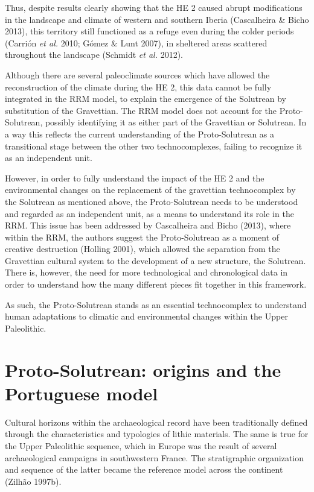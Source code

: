 \documentclass[12pt,twoside]{reedthesis}
\begin{document}
Thus, despite results clearly showing that the HE 2 caused abrupt modifications in the landscape and climate of western and southern Iberia (Cascalheira \& Bicho 2013), this territory still functioned as a refuge even during the colder periods (Carrión \emph{et al.} 2010; Gómez \& Lunt 2007), in sheltered areas scattered throughout the landscape (Schmidt \emph{et al.} 2012).

Although there are several paleoclimate sources which have allowed the reconstruction of the climate during the HE 2, this data cannot be fully integrated in the RRM model, to explain the emergence of the Solutrean by substitution of the Gravettian. The RRM model does not account for the Proto-Solutrean, possibly identifying it as either part of the Gravettian or Solutrean. In a way this reflects the current understanding of the Proto-Solutrean as a transitional stage between the other two technocomplexes, failing to recognize it as an independent unit.

However, in order to fully understand the impact of the HE 2 and the environmental changes on the replacement of the gravettian technocomplex by the Solutrean as mentioned above, the Proto-Solutrean needs to be understood and regarded as an independent unit, as a means to understand its role in the RRM. This issue has been addressed by Cascalheira and Bicho (2013), where within the RRM, the authors suggest the Proto-Solutrean as a moment of creative destruction (Holling 2001), which allowed the separation from the Gravettian cultural system to the development of a new structure, the Solutrean. There is, however, the need for more technological and chronological data in order to understand how the many different pieces fit together in this framework.

As such, the Proto-Solutrean stands as an essential technocomplex to understand human adaptations to climatic and environmental changes within the Upper Paleolithic.

\hypertarget{proto-solutrean-origins-and-the-portuguese-model}{%
\section{Proto-Solutrean: origins and the Portuguese model}\label{proto-solutrean-origins-and-the-portuguese-model}}

Cultural horizons within the archaeological record have been traditionally defined through the characteristics and typologies of lithic materials. The same is true for the Upper Paleolithic sequence, which in Europe was the result of several archaeological campaigns in southwestern France. The stratigraphic organization and sequence of the latter became the reference model across the continent (Zilhão 1997b).
\end{document}
